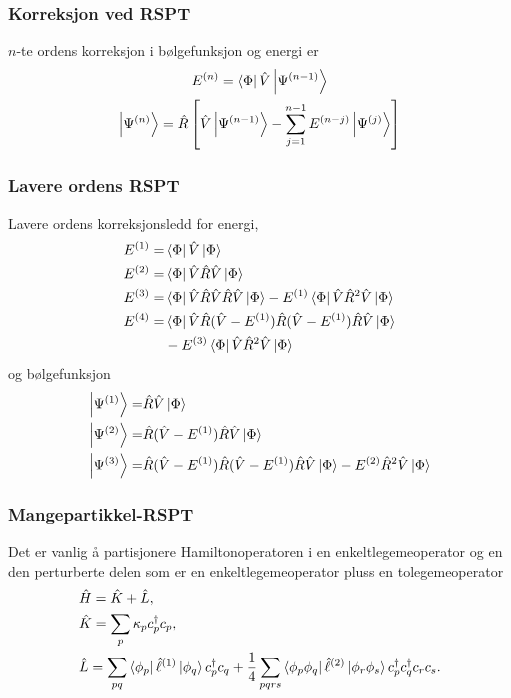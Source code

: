 \documentclass{beamer}
\begin{document}
\begin{frame}
	\frametitle{Korreksjon ved RSPT}
	$n$-te ordens korreksjon i bølgefunksjon og energi er
	\begin{gather}
		E^{(n)} = \bra{\Phi}\hat V \ket{\Psi^{(n-1)}}\\
		\ket{\Psi^{(n)}} = \hat R \left[\hat V \ket{\Psi^{(n-1)}} - \sum_{j=1}^{n-1}E^{(n-j)}\ket{\Psi^{(j)}} \right]
	\end{gather}

\end{frame}
	

\begin{frame}
	
	\frametitle{Lavere ordens RSPT}
	Lavere ordens korreksjonsledd for energi,
	\begin{align}
		E^{(1)} =& \bra{\Phi} \hat V \ket{\Phi} \\
		E^{(2)} =& \bra{\Phi} \hat V \hat R \hat V \ket{\Phi} \\
		E^{(3)} =& \bra{\Phi} \hat V \hat R \hat V \hat R \hat V \ket{\Phi} - E^{(1)}\bra{\Phi} \hat V \hat R^2 \hat V \ket{\Phi} \\
		E^{(4)} = & \bra{\Phi} \hat V\hat R (\hat V - E^{(1)}) \hat R (\hat V - E^{(1)}) \hat R \hat V \ket{\Phi}  \\
					&- E^{(3)}\bra{\Phi}\hat V \hat R^2 \hat V \ket{\Phi}
	\end{align}
	og bølgefunksjon
	\begin{align}
		\ket{\Psi^{(1)}} =& \hat R \hat V \ket{\Phi} \\
		\ket{\Psi^{(2)}} =& \hat R (\hat V - E^{(1)}) \hat R \hat V\ket{\Phi} \\
		\ket{\Psi^{(3)}} =& \hat R (\hat V - E^{(1)}) \hat R (\hat V - E^{(1)}) \hat R \hat V \ket{\Phi} - E^{(2)}\hat R^2 \hat V\ket{\Phi}
	\end{align}
	
\end{frame}


\begin{frame}
	
	\frametitle{Mangepartikkel-RSPT}

	Det er vanlig å partisjonere Hamiltonoperatoren i en enkeltlegemeoperator og en den perturberte delen som er en enkeltlegemeoperator pluss en tolegemeoperator
	\begin{align}
		&\hat H = \hat K + \hat L, \\
		&\hat K = \sum_p \kappa_p c^\dagger_p c_p, \\
		&\hat L = \sum_{pq} \bra{\phi_p} \hat \ell^{(1)}\ket{\phi_q}c^\dagger_p c_q + \frac{1}{4}\sum_{pqrs}\bra{\phi_p\phi_q}\hat \ell^{(2)} \ket{\phi_r\phi_s}c^\dagger_p c^\dagger_q c_r c_s.
	\end{align}	
	
\end{frame}
\end{document}
